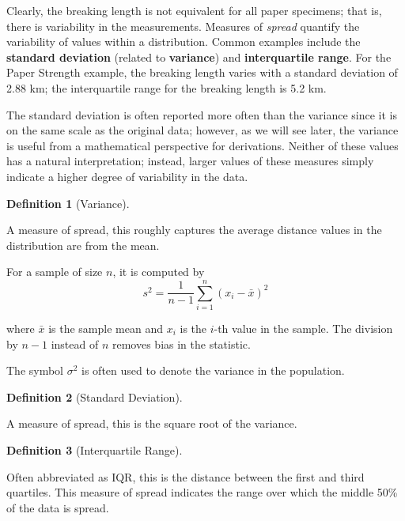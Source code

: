 \documentclass[
  letterpaper,
  DIV=11,
  numbers=noendperiod]{scrreprt}
\theoremstyle{plain}
\theoremstyle{definition}
\theoremstyle{definition}
\newtheorem{definition}{Definition}[chapter]
\theoremstyle{remark}
\begin{document}
Clearly, the breaking length is not equivalent for all paper specimens;
that is, there is variability in the measurements. Measures of
\emph{spread} quantify the variability of values within a distribution.
Common examples include the \textbf{standard deviation} (related to
\textbf{variance}) and \textbf{interquartile range}. For the Paper
Strength example, the breaking length varies with a standard deviation
of 2.88 km; the interquartile range for the breaking length is 5.2 km.

The standard deviation is often reported more often than the variance
since it is on the same scale as the original data; however, as we will
see later, the variance is useful from a mathematical perspective for
derivations. Neither of these values has a natural interpretation;
instead, larger values of these measures simply indicate a higher degree
of variability in the data.

\begin{definition}[Variance]\protect\hypertarget{def-variance}{}\label{def-variance}

A measure of spread, this roughly captures the average distance values
in the distribution are from the mean.

For a sample of size \(n\), it is computed by
\[s^2 = \frac{1}{n-1}\sum_{i=1}^{n} \left(x_i - \bar{x}\right)^2\]

where \(\bar{x}\) is the sample mean and \(x_i\) is the \(i\)-th value
in the sample. The division by \(n-1\) instead of \(n\) removes bias in
the statistic.

The symbol \(\sigma^2\) is often used to denote the variance in the
population.

\end{definition}

\begin{definition}[Standard
Deviation]\protect\hypertarget{def-standard-deviation}{}\label{def-standard-deviation}

A measure of spread, this is the square root of the variance.

\end{definition}

\begin{definition}[Interquartile
Range]\protect\hypertarget{def-interquartile-range}{}\label{def-interquartile-range}

Often abbreviated as IQR, this is the distance between the first and
third quartiles. This measure of spread indicates the range over which
the middle 50\% of the data is spread.

\end{definition}
\end{document}
